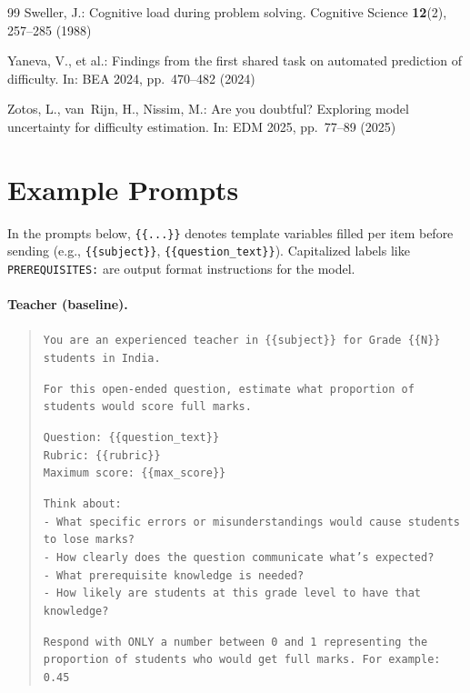 \documentclass[runningheads]{llncs}
\begin{document}
\begin{thebibliography}{99}
Sweller, J.: Cognitive load during problem solving. Cognitive Science \textbf{12}(2), 257--285 (1988)

Yaneva, V., et al.: Findings from the first shared task on automated prediction of difficulty. In: BEA 2024, pp.\ 470--482 (2024)

Zotos, L., van~Rijn, H., Nissim, M.: Are you doubtful? Exploring model uncertainty for difficulty estimation. In: EDM 2025, pp.\ 77--89 (2025)

\end{thebibliography}

\appendix
\section{Example Prompts}\label{app:prompts}

In the prompts below, \texttt{\{\{...\}\}} denotes template variables filled per item before sending (e.g., \texttt{\{\{subject\}\}}, \texttt{\{\{question\_text\}\}}). Capitalized labels like \texttt{PREREQUISITES:} are output format instructions for the model.

\paragraph{Teacher (baseline).}
\begin{quote}\small
\texttt{You are an experienced teacher in \{\{subject\}\} for Grade \{\{N\}\} students in India.}

\texttt{For this open-ended question, estimate what proportion of students would score full marks.}

\texttt{Question: \{\{question\_text\}\}}\\
\texttt{Rubric: \{\{rubric\}\}}\\
\texttt{Maximum score: \{\{max\_score\}\}}

\texttt{Think about:}\\
\texttt{- What specific errors or misunderstandings would cause students to lose marks?}\\
\texttt{- How clearly does the question communicate what's expected?}\\
\texttt{- What prerequisite knowledge is needed?}\\
\texttt{- How likely are students at this grade level to have that knowledge?}

\texttt{Respond with ONLY a number between 0 and 1 representing the proportion of students who would get full marks. For example: 0.45}
\end{quote}
\end{document}
